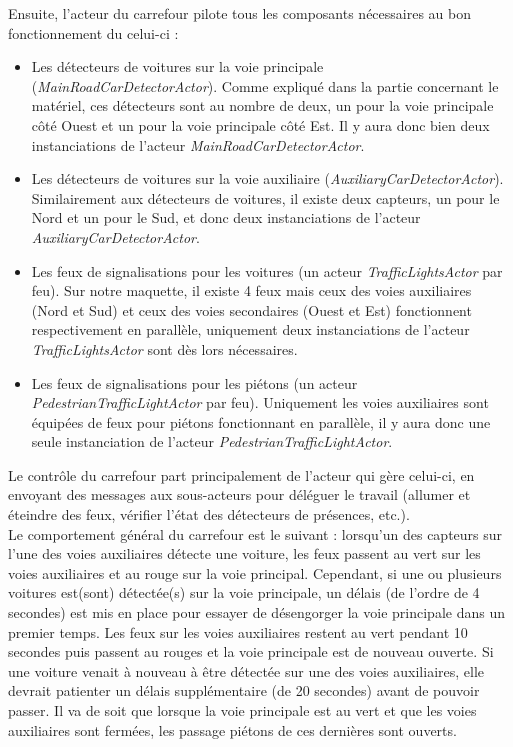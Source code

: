 Ensuite, l’acteur du carrefour pilote tous les composants nécessaires au bon fonctionnement du celui-ci :
\begin{itemize}
\item Les détecteurs de voitures sur la voie principale (\emph{MainRoadCarDetectorActor}). Comme expliqué dans la partie concernant le matériel, ces détecteurs sont au nombre de deux, un pour la voie principale côté Ouest et un pour la voie principale côté Est. Il y aura donc bien deux instanciations de l’acteur \emph{MainRoadCarDetectorActor}.
\item Les détecteurs de voitures sur la voie auxiliaire (\emph{AuxiliaryCarDetectorActor}). Similairement aux détecteurs de voitures, il existe deux capteurs, un pour le Nord et un pour le Sud, et donc deux instanciations de l’acteur \emph{AuxiliaryCarDetectorActor}.
\item Les feux de signalisations pour les voitures (un acteur \emph{TrafficLightsActor} par feu). Sur notre maquette, il existe 4 feux mais ceux des voies auxiliaires (Nord et Sud) et ceux des voies secondaires (Ouest et Est) fonctionnent respectivement en parallèle, uniquement deux instanciations de l’acteur \emph{TrafficLightsActor} sont dès lors nécessaires.
\item Les feux de signalisations pour les piétons (un acteur \emph{PedestrianTrafficLightActor} par feu). Uniquement les voies auxiliaires sont équipées de feux pour piétons fonctionnant en parallèle, il y aura donc une seule instanciation de l’acteur \emph{PedestrianTrafficLightActor}.
\end{itemize}

Le contrôle du carrefour part principalement de l’acteur qui gère celui-ci, en envoyant des messages aux sous-acteurs pour déléguer le travail (allumer et éteindre des feux, vérifier l’état des détecteurs de présences, etc.).\\

Le comportement général du carrefour est le suivant : lorsqu'un des capteurs sur l'une des voies auxiliaires détecte une voiture, les feux passent au vert sur les voies auxiliaires et au rouge sur la voie principal. Cependant, si une ou plusieurs voitures est(sont) détectée(s) sur la voie principale, un délais (de l'ordre de 4 secondes) est mis en place pour essayer de désengorger la voie principale dans un premier temps.
Les feux sur les voies auxiliaires restent au vert pendant 10 secondes puis passent au rouges et la voie principale est de nouveau ouverte. Si une voiture venait à nouveau à être détectée sur une des voies auxiliaires, elle devrait patienter un délais supplémentaire (de 20 secondes) avant de pouvoir passer.
Il va de soit que lorsque la voie principale est au vert et que les voies auxiliaires sont fermées, les passage piétons de ces dernières sont ouverts.\\

